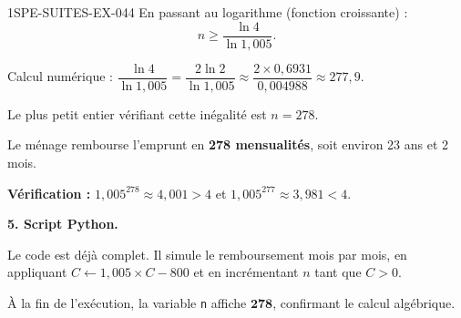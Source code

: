 \begin{corrige}{1SPE-SUITES-EX-044}
En passant au logarithme (fonction croissante) :
\[
n \geq \frac{\ln 4}{\ln 1{,}005}.
\]

Calcul numérique : $\dfrac{\ln 4}{\ln 1{,}005} = \dfrac{2\ln 2}{\ln 1{,}005} \approx \dfrac{2 \times 0{,}6931}{0{,}004988} \approx 277{,}9$.

Le plus petit entier vérifiant cette inégalité est $n = 278$.

Le ménage rembourse l'emprunt en \textbf{278 mensualités}, soit environ 23 ans et 2 mois.

\textbf{Vérification :} $1{,}005^{278} \approx 4{,}001 > 4$ et $1{,}005^{277} \approx 3{,}981 < 4$. \checkmark

\textbf{5. Script Python.}

Le code est déjà complet. Il simule le remboursement mois par mois, en appliquant $C \leftarrow 1{,}005 \times C - 800$ et en incrémentant $n$ tant que $C > 0$.

À la fin de l'exécution, la variable \texttt{n} affiche $\mathbf{278}$, confirmant le calcul algébrique.

\end{corrige}
